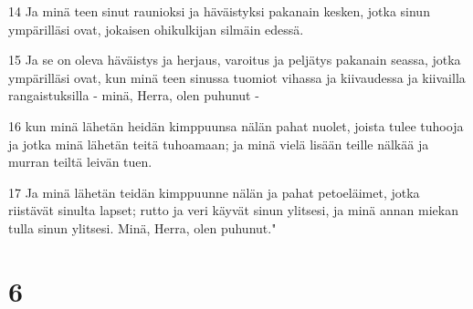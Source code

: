 \par 14 Ja minä teen sinut raunioksi ja häväistyksi pakanain kesken, jotka sinun ympärilläsi ovat, jokaisen ohikulkijan silmäin edessä.
\par 15 Ja se on oleva häväistys ja herjaus, varoitus ja peljätys pakanain seassa, jotka ympärilläsi ovat, kun minä teen sinussa tuomiot vihassa ja kiivaudessa ja kiivailla rangaistuksilla - minä, Herra, olen puhunut -
\par 16 kun minä lähetän heidän kimppuunsa nälän pahat nuolet, joista tulee tuhooja ja jotka minä lähetän teitä tuhoamaan; ja minä vielä lisään teille nälkää ja murran teiltä leivän tuen.
\par 17 Ja minä lähetän teidän kimppuunne nälän ja pahat petoeläimet, jotka riistävät sinulta lapset; rutto ja veri käyvät sinun ylitsesi, ja minä annan miekan tulla sinun ylitsesi. Minä, Herra, olen puhunut."

\chapter{6}

